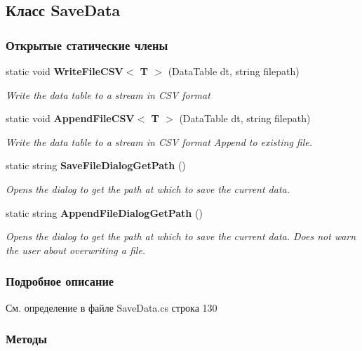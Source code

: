 \subsection{Класс Save\+Data}
\label{classkdz__manager_1_1_save_data}
\subsubsection*{Открытые статические члены}
\begin{DoxyCompactItemize}
\item 
static void {\bf Write\+File\+C\+S\+V$<$ T $>$} (Data\+Table dt, string filepath)
\begin{DoxyCompactList}\small\item\em Write the data table to a stream in C\+S\+V format \end{DoxyCompactList}\item 
static void {\bf Append\+File\+C\+S\+V$<$ T $>$} (Data\+Table dt, string filepath)
\begin{DoxyCompactList}\small\item\em Write the data table to a stream in C\+S\+V format Append to existing file. \end{DoxyCompactList}\item 
static string {\bf Save\+File\+Dialog\+Get\+Path} ()
\begin{DoxyCompactList}\small\item\em Opens the dialog to get the path at which to save the current data. \end{DoxyCompactList}\item 
static string {\bf Append\+File\+Dialog\+Get\+Path} ()
\begin{DoxyCompactList}\small\item\em Opens the dialog to get the path at which to save the current data. Does not warn the user about overwriting a file. \end{DoxyCompactList}\end{DoxyCompactItemize}


\subsubsection{Подробное описание}


См. определение в файле Save\+Data.\+cs строка 130



\subsubsection{Методы}
